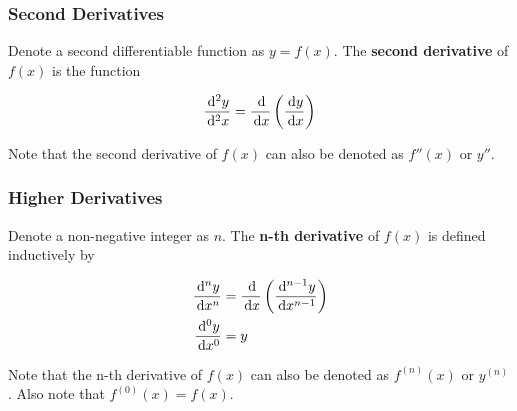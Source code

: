 \documentclass[a4paper,12pt]{article}
\begin{document}
\subsubsection{Second Derivatives}
\begin{dft}
  Denote a second differentiable function as $y=f(x)$. The \textbf{second derivative} of $f(x)$ is the function

  $$\frac{\,\mathrm{d}^2 y}{\,\mathrm{d}^2 x}=\frac{\,\mathrm{d}}{\,\mathrm{d} x}\left( \frac{\,\mathrm{d} y}{\,\mathrm{d} x}\right)$$
\end{dft}\n

Note that the second derivative of $f(x)$ can also be denoted as $f''(x)$ or $y''$.

\subsubsection{Higher Derivatives}
\begin{dft}
  Denote a non-negative integer as $n$. The \textbf{n-th derivative} of $f(x)$ is defined inductively by

  $$\begin{aligned}[t]
    \frac{\,\mathrm{d}^{n} y}{\,\mathrm{d} x^{n}}&=\frac{\,\mathrm{d}}{\,\mathrm{d} x}\left( \frac{\,\mathrm{d}^{n-1} y}{\,\mathrm{d} x^{n-1}}\right)\\
    \frac{\,\mathrm{d}^{0} y}{\,\mathrm{d} x^{0}}&=y
  \end{aligned}$$
\end{dft}\n

Note that the n-th derivative of $f(x)$ can also be denoted as $f^{(n)}(x)$ or $y^{(n)}$. Also note that $f^{(0)}(x)=f(x)$.
\end{document}
